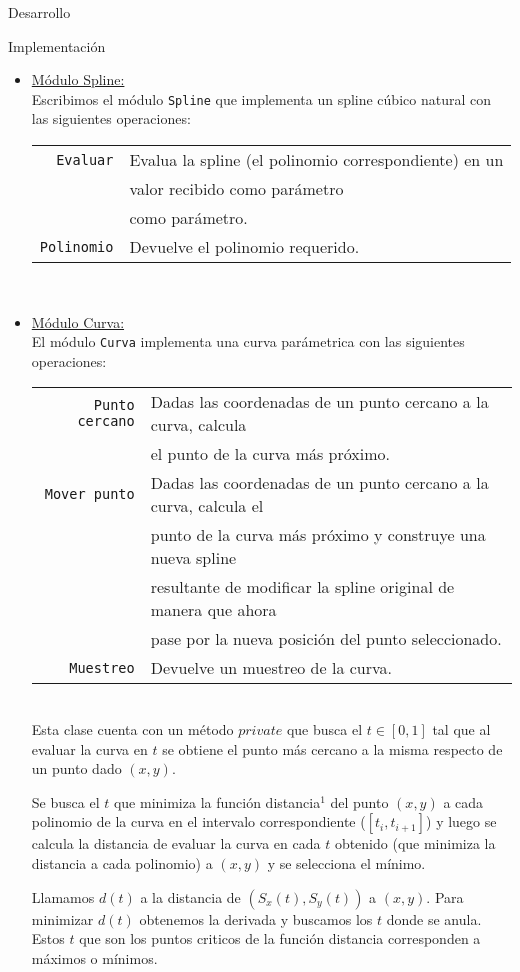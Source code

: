 \begin{section}{Desarrollo}
\begin{subsection}{Implementación}
\begin{itemize}
			\item \underline{Módulo Spline:}\\
				Escribimos el módulo \texttt{Spline} que implementa un spline cúbico natural con las siguientes operaciones:\\
				
				\begin{tabular}{rl}
					\texttt{Evaluar} & Evalua la spline (el polinomio correspondiente) en un\\
									 & valor recibido como parámetro\\
									 & como parámetro.\\
					\texttt{Polinomio} & Devuelve el polinomio requerido.\\
				\end{tabular}\\

			\item \underline{Módulo Curva:}\\
				El módulo \texttt{Curva} implementa una curva parámetrica con las siguientes operaciones:\\
				
				\begin{tabular}{rl}
					\texttt{Punto cercano} & Dadas las coordenadas de un punto cercano a la curva, calcula\\
										   & el punto de la curva más próximo.\\
					\texttt{Mover punto} & Dadas las coordenadas de un punto cercano a la curva, calcula el\\
										 & punto de la curva más próximo y construye una nueva spline\\
										 & resultante de modificar la spline original de manera que ahora\\
										 & pase por la nueva posición del punto seleccionado.\\
					\texttt{Muestreo} & Devuelve un muestreo de la curva.\\
				\end{tabular}\\
				
				Esta clase cuenta con un método $private$ que busca el $t \in [0,1]$ tal que al evaluar la curva en $t$ se obtiene el punto más cercano a la 
				misma respecto de un punto dado $(x,y)$.
				
				Se busca el $t$ que minimiza la función distancia$^1$
				del punto $(x,y)$ a cada polinomio de la curva en el intervalo correspondiente ($[t_i,t_{i+1}]$) y luego se calcula la distancia de evaluar
				la curva en cada $t$ obtenido (que minimiza la distancia a cada polinomio) a $(x,y)$ y se selecciona el mínimo.
				
				Llamamos $d(t)$ a la distancia de $(S_x(t),S_y(t))$ a $(x,y)$. Para minimizar $d(t)$ obtenemos la derivada y buscamos los $t$ donde se anula. 
				Estos $t$ que son los puntos criticos de la función distancia corresponden a máximos o mínimos. 
				
				
		\end{itemize}
	\end{subsection}
\end{section}
